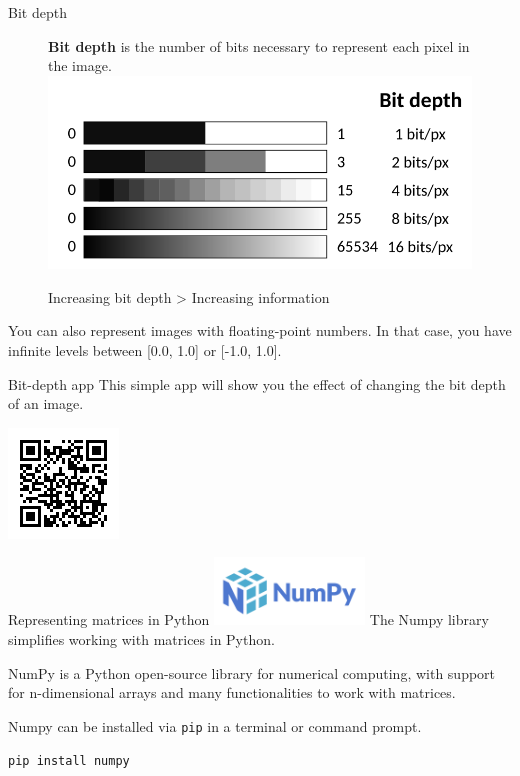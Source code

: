 \documentclass[9pt, aspectratio=169]{beamer}
\begin{document}
\begin{frame}
    {Bit depth}
    \begin{figure}
        \textbf{Bit depth} is the number of bits necessary to represent each pixel in the image.
        \centering
        \includegraphics[width=.6\textwidth]{bitdepth.png}
        \caption{Increasing bit depth > Increasing information}
    \end{figure}
    \pause

    You can also represent images with floating-point numbers. In that case, you have infinite levels between [0.0, 1.0] or [-1.0, 1.0].\\
\end{frame}

\begin{frame}
    {Bit-depth app}
    This simple app will show you the effect of changing the bit depth of an image.

    \centering
    \includegraphics[width=.4\textwidth]{qrcode_bitdepth.png}
\end{frame}

\begin{frame}
    {Representing matrices in Python}
    \includegraphics[width = 0.3\textwidth]{numpylogo.png}
    The Numpy library simplifies working with matrices in Python.

    NumPy is a Python open-source library for numerical computing, with support for n-dimensional arrays and many functionalities to work with matrices.

    Numpy can be installed via \texttt{pip} in a terminal or command prompt.

    \begin{codebox}
        \texttt{pip install numpy}
    \end{codebox}
\end{frame}
\end{document}
